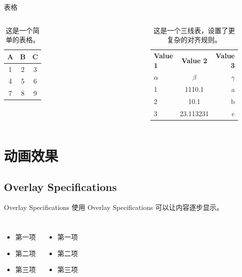\documentclass[aspectratio=169]{ctexbeamer}
\begin{document}
\begin{frame}{表格}
  \begin{columns}
    \begin{table}
      \centering
      \begin{tabular}{|c|c|c|}
        \hline
        A & B & C \\
        \hline
        1 & 2 & 3 \\
        4 & 5 & 6 \\
        7 & 8 & 9 \\
        \hline
      \end{tabular}
      \caption{这是一个简单的表格。}
    \end{table}
    \begin{table}
      \centering
      \begin{tabular}{l|S|r}
        \toprule %
        \textbf{Value 1} & \textbf{Value 2} & \textbf{Value 3}\\
        $\alpha$ & $\beta$ & $\gamma$ \\
         & 1110.1 & a\\
        2 & 10.1 & b\\
        3 & 23.113231 & c\\
        \bottomrule %
      \end{tabular}
      \label{tab:table1}
      \caption{这是一个三线表，设置了更复杂的对齐规则。}
    \end{table}
  \end{columns}
\end{frame}

\section{动画效果}

\subsection{Overlay Specifications}

\begin{frame}{Overlay Specifications}
  使用 Overlay Specifications 可以让内容逐步显示。
  \begin{columns}
    \begin{itemize}
      \item<1-> 第一项
      \item<2-> 第二项 
      \item<3-> 第三项
    \end{itemize}
    \begin{itemize}
      \item<3-> \alert<3>{第一项}
      \item<4-> 第二项
      \item<5-> 第三项
    \end{itemize}
  \end{columns}
\end{frame}
\end{document}

